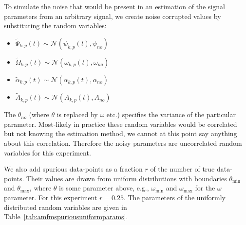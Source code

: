 To simulate the noise that would be present in an estimation of the signal
parameters from an arbitrary signal, we create noise corrupted values by
substituting the random variables:
\begin{itemize}
    \item
        $\tilde{\Psi}_{k,p}(t) \sim
        \mathcal{N}(\psi_{k,p}(t),\psi_{no})$
    \item
        $\tilde{\Omega}_{k,p}(t) \sim
        \mathcal{N}(\omega_{k,p}(t),\omega_{no})$
    \item
        $\tilde{\alpha}_{k,p}(t) \sim
        \mathcal{N}(\alpha_{k,p}(t),\alpha_{no})$
    \item
        $\tilde{A}_{k,p}(t) \sim
        \mathcal{N}(A_{k,p}(t),A_{no})$
\end{itemize}
The $\theta_{no}$ (where $\theta$ is replaced by $\omega$ etc.) specifies the
variance of the particular parameter. Most-likely in practice these random
variables would be correlated but not knowing the estimation method, we cannot
at this point say anything about this correlation. Therefore the noisy
parameters are uncorrelated random variables for this experiment.

We also add spurious data-points as a fraction $r$ of the number of true
data-points.  Their values are drawn from uniform distributions with boundaries
$\theta_{\text{min}}$ and $\theta_{\text{max}}$, where $\theta$ is some
parameter above, e.g., $\omega_{\text{min}}$ and $\omega_{\text{max}}$ for the
$\omega$ parameter. For this experiment $r = 0.25$. The parameters of the
uniformly distributed random variables are given in
Table~\ref{tab:amfmspuriousuniformparams}.

